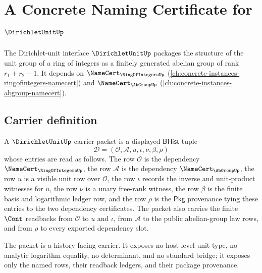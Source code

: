 \chapter{A Concrete Naming Certificate for $\DirichletUnitUp$}
\label{ch:concrete-instances-dirichletunit-namecert}

The Dirichlet-unit interface $\DirichletUnitUp$ packages the structure of the unit group of a ring of integers as a finitely generated abelian group of rank $r_1 + r_2 - 1$. It depends on $\NameCert_{\RingOfIntegersUp}$ (\autoref{ch:concrete-instances-ringofintegers-namecert}) and $\NameCert_{\AbGroupUp}$ (\autoref{ch:concrete-instances-abgroup-namecert}).

\section{Carrier definition}
\label{sec:dirichletunit-carrier}

\begin{definition}
\label{def:dirichletunit-carrier-packet}
A $\DirichletUnitUp$ carrier packet is a displayed $\mathsf{BHist}$ tuple
$$
\mathcal{D}=(\mathcal{O},\mathcal{A},u,\iota,\nu,\beta,\rho)
$$
whose entries are read as follows. The row $\mathcal{O}$ is the dependency $\NameCert_{\RingOfIntegersUp}$, the row $\mathcal{A}$ is the dependency $\NameCert_{\AbGroupUp}$, the row $u$ is a visible unit row over $\mathcal{O}$, the row $\iota$ records the inverse and unit-product witnesses for $u$, the row $\nu$ is a unary free-rank witness, the row $\beta$ is the finite basis and logarithmic ledger row, and the row $\rho$ is the $\mathsf{Pkg}$ provenance tying these entries to the two dependency certificates. The packet also carries the finite $\Cont$ readbacks from $\mathcal{O}$ to $u$ and $\iota$, from $\mathcal{A}$ to the public abelian-group law rows, and from $\rho$ to every exported dependency slot.

The packet is a history-facing carrier. It exposes no host-level unit type, no analytic logarithm equality, no determinant, and no standard bridge; it exposes only the named rows, their readback ledgers, and their package provenance.
\end{definition}

